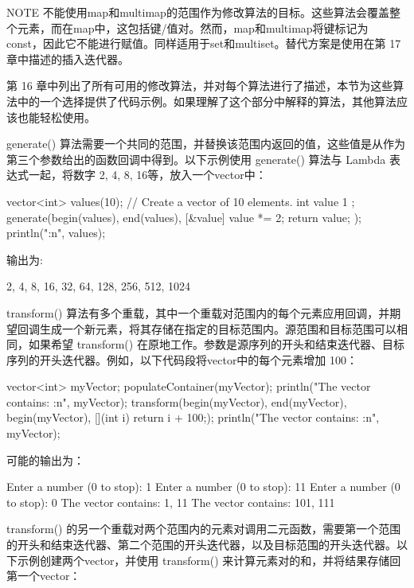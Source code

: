 \begin{myNotic}{NOTE}
不能使用map和multimap的范围作为修改算法的目标。这些算法会覆盖整个元素，而在map中，这包括键/值对。然而，map和multimap将键标记为 const，因此它不能进行赋值。同样适用于set和multiset。替代方案是使用在第 17 章中描述的插入迭代器。
\end{myNotic}

第 16 章中列出了所有可用的修改算法，并对每个算法进行了描述，本节为这些算法中的一个选择提供了代码示例。如果理解了这个部分中解释的算法，其他算法应该也能轻松使用。


generate() 算法需要一个共同的范围，并替换该范围内返回的值，这些值是从作为第三个参数给出的函数回调中得到。以下示例使用 generate() 算法与 Lambda 表达式一起，将数字 2, 4, 8, 16等，放入一个vector中：

\begin{cpp}
vector<int> values(10); // Create a vector of 10 elements.
int value { 1 };
generate(begin(values), end(values), [&value]{ value *= 2; return value; });
println("{:n}", values);
\end{cpp}

输出为:

\begin{shell}
2, 4, 8, 16, 32, 64, 128, 256, 512, 1024
\end{shell}


transform() 算法有多个重载，其中一个重载对范围内的每个元素应用回调，并期望回调生成一个新元素，将其存储在指定的目标范围内。源范围和目标范围可以相同，如果希望 transform() 在原地工作。参数是源序列的开头和结束迭代器、目标序列的开头迭代器。例如，以下代码段将vector中的每个元素增加 100：

\begin{cpp}
vector<int> myVector;
populateContainer(myVector);
println("The vector contains: {:n}", myVector);
transform(begin(myVector), end(myVector), begin(myVector),
    [](int i){ return i + 100;});
println("The vector contains: {:n}", myVector);
\end{cpp}

可能的输出为：

\begin{shell}
Enter a number (0 to stop): 1
Enter a number (0 to stop): 11
Enter a number (0 to stop): 0
The vector contains: 1, 11
The vector contains: 101, 111
\end{shell}

transform() 的另一个重载对两个范围内的元素对调用二元函数，需要第一个范围的开头和结束迭代器、第二个范围的开头迭代器，以及目标范围的开头迭代器。以下示例创建两个vector，并使用 transform() 来计算元素对的和，并将结果存储回第一个vector：

